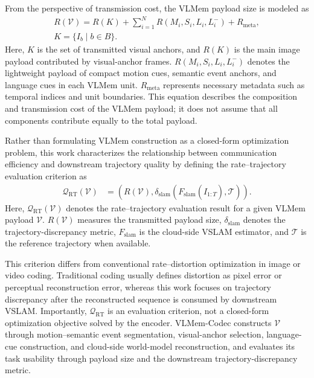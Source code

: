 \documentclass[journal]{IEEEtran}
\begin{document}
From the perspective of transmission cost, the VLMem payload size is modeled as
\begin{equation}
\begin{gathered}
R(\mathcal{V})=
R(K)+\sum_{i=1}^{N}R(M_i,S_i,L_i,L_i^-)+R_{\mathrm{meta}},\\
K=\{I_b\mid b\in B\}.
\end{gathered}
\label{eq:transmission_cost}
\end{equation}
Here, \(K\) is the set of transmitted visual anchors, and \(R(K)\) is the main image payload contributed by visual-anchor frames. \(R(M_i,S_i,L_i,L_i^-)\) denotes the lightweight payload of compact motion cues, semantic event anchors, and language cues in each VLMem unit. \(R_{\mathrm{meta}}\) represents necessary metadata such as temporal indices and unit boundaries. This equation describes the composition and transmission cost of the VLMem payload; it does not assume that all components contribute equally to the total payload.

Rather than formulating VLMem construction as a closed-form optimization problem, this work characterizes the relationship between communication efficiency and downstream trajectory quality by defining the rate--trajectory evaluation criterion as
\begin{equation}
\begin{aligned}
\mathcal{Q}_{\mathrm{RT}}(\mathcal{V})
&=
\left(
R(\mathcal{V}),
\delta_{\mathrm{slam}}\left(
F_{\mathrm{slam}}(\hat{I}_{1:T}),\mathcal{T}
\right)
\right).
\end{aligned}
\label{eq:rate_trajectory_design}
\end{equation}
Here, \(\mathcal{Q}_{\mathrm{RT}}(\mathcal{V})\) denotes the rate--trajectory evaluation result for a given VLMem payload \(\mathcal{V}\). \(R(\mathcal{V})\) measures the transmitted payload size, \(\delta_{\mathrm{slam}}\) denotes the trajectory-discrepancy metric, \(F_{\mathrm{slam}}\) is the cloud-side VSLAM estimator, and \(\mathcal{T}\) is the reference trajectory when available.

This criterion differs from conventional rate--distortion optimization in image or video coding. Traditional coding usually defines distortion as pixel error or perceptual reconstruction error, whereas this work focuses on trajectory discrepancy after the reconstructed sequence is consumed by downstream VSLAM. Importantly, \(\mathcal{Q}_{\mathrm{RT}}\) is an evaluation criterion, not a closed-form optimization objective solved by the encoder. VLMem-Codec constructs \(\mathcal{V}\) through motion--semantic event segmentation, visual-anchor selection, language-cue construction, and cloud-side world-model reconstruction, and evaluates its task usability through payload size and the downstream trajectory-discrepancy metric.
\end{document}
